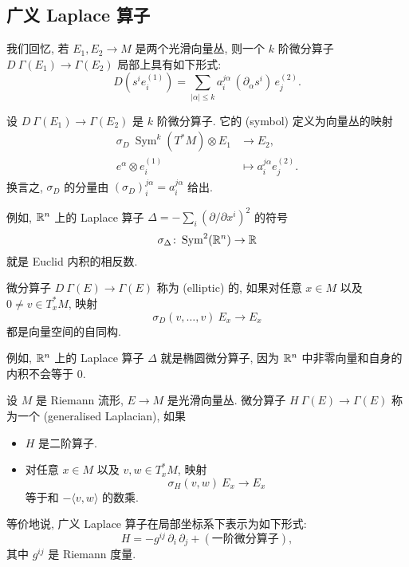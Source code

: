 \subsection{广义 Laplace 算子}

我们回忆, 若 $E_1, E_2 \to M$ 是两个光滑向量丛,
则一个 $k$ 阶微分算子 $D \: \Gamma (E_1) \to \Gamma (E_2)$ 局部上具有如下形式:
\[ D (s^i e_i^{(1)}) = \sum_{ |\alpha| \leq k } 
    a_{i}^{j \alpha} \, ( \partial_{\alpha} s^i ) \, e_j^{(2)}. \]

\begin{definition}
    设 $D \: \Gamma (E_1) \to \Gamma (E_2)$ 是 $k$ 阶微分算子.
    它的 (symbol) 定义为向量丛的映射
    \begin{align*}
        \sigma_D \: \operatorname{Sym}^k (T^* M) \otimes E_1 &\to E_2, \\
        e^\alpha \otimes e_i^{(1)} &\mapsto a_i^{j \alpha} e_j^{(2)}.
    \end{align*}
    换言之, $\sigma_D$ 的分量由 $(\sigma_D)_i^{j \alpha} = a_i^{j \alpha}$ 给出.
\end{definition}

例如, $\mathbb{R}^n$ 上的 Laplace 算子 $\Delta = -\sum_i ( \partial / \partial x^i )^2$ 的符号
\[ \sigma_{\Delta} \colon \operatorname{Sym}^2 (\mathbb{R}^n) \to \mathbb{R} \]
就是 Euclid 内积的相反数.

\begin{definition}
    微分算子 $D \: \Gamma (E) \to \Gamma (E)$ 称为 (elliptic) 的,
    如果对任意 $x \in M$ 以及 $0 \neq v \in T_x^* M$, 映射
    \[ \sigma_D (v, \dotsc, v) \: E_x \to E_x \]
    都是向量空间的自同构.
\end{definition}

例如, $\mathbb{R}^n$ 上的 Laplace 算子 $\Delta$ 就是椭圆微分算子,
因为 $\mathbb{R}^n$ 中非零向量和自身的内积不会等于 $0$.

\begin{definition}
    设 $M$ 是 Riemann 流形, $E \to M$ 是光滑向量丛.
    微分算子 $H \: \Gamma (E) \to \Gamma (E)$ 
    称为一个 (generalised Laplacian), 如果
    \begin{itemize}
        \item 
            $H$ 是二阶算子.
        \item
            对任意 $x \in M$ 以及 $v, w \in T_x^* M$, 映射
            \[ \sigma_H (v, w) \: E_x \to E_x \]
            等于和 $-\langle v, w \rangle$ 的数乘.
    \end{itemize}
    等价地说, 广义 Laplace 算子在局部坐标系下表示为如下形式:
    \[ H = -g^{ij} \, \partial_i \, \partial_j + (\text{一阶微分算子}), \]
    其中 $g^{ij}$ 是 Riemann 度量.
\end{definition}

